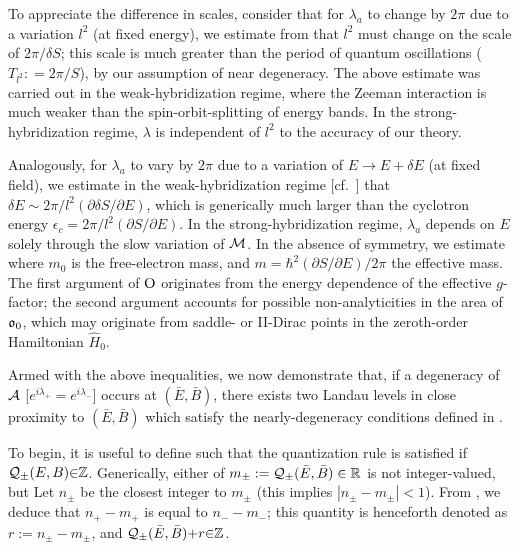 \documentclass[aps, showpacs, twocolumn, notitlepage, superscriptaddress]{revtex4-1}
\begin{document}
To appreciate the difference in scales, consider that for $\lambda_a$ to change by $2\pi$ due to a variation $l^2$ (at fixed energy), we estimate from  that $l^2$ must change on the scale of $2\pi/\delta S$; this scale is much greater than the period of quantum oscillations ($T_{l^2}{:}{=}2\pi/S$), by our assumption of near degeneracy. The above estimate was carried out in the weak-hybridization regime, where the Zeeman interaction is much weaker than the spin-orbit-splitting of energy bands. In the strong-hybridization regime, $\lambda$ is independent of $l^2$ to the accuracy of our theory.

Analogously, for $\lambda_a$ to vary by $2\pi$ due to a variation of $E\rightarrow E+\delta E$ (at fixed field), we estimate in the weak-hybridization regime [cf.\ ] that $\delta E {\sim} 2\pi/l^2 (\partial \delta S/\partial E)$, which is generically much larger than the cyclotron energy $\epsilon_c{=}2\pi/l^2 (\partial  S/\partial E)$. In the strong-hybridization regime, $\lambda_a$ depends on $E$ solely through the slow variation of ${\cal M}$.  In the absence of symmetry, we estimate 
where $m_0$ is the free-electron mass, and $m{=}\hbar^2(\partial S/\partial E)/2\pi$ the effective mass. The first argument of $\text{O}$ originates from the energy dependence of the effective $g$-factor; the second argument accounts for possible non-analyticities in the area of $\mathfrak{o}_0$, which may originate from saddle- or II-Dirac points in the zeroth-order Hamiltonian $\hat{H}_0$.

Armed with the above inequalities, we now demonstrate that, if a degeneracy of ${\cal A}$ [$e^{i\lambda_+}{=}e^{i\lambda_-}$] occurs at $(\bar{E},\bar{B})$, there exists two Landau levels in close proximity to $(\bar{E},\bar{B})$ which satisfy the nearly-degeneracy conditions defined in .

To begin, it is useful to define
such that the quantization rule  is satisfied if ${\cal Q}_{\pm}(E,B){\in}\mathbb{Z}$. 
Generically, either of $m_{\pm}:={\cal Q}_{\pm}(\bar{E},\bar{B})\in \mathbb{R}$ is not integer-valued, but 
Let $n_{\pm}$ be the closest integer to $m_{\pm}$ (this implies $|n_{\pm}-m_{\pm}|<1$).  From , we deduce that $n_+-m_+$ is equal to $n_--m_-$; this quantity is henceforth denoted as $r:= n_{\pm}-m_{\pm}$, and  ${\cal Q}_{\pm}(\bar{E},\bar{B}){+}r{\in} \mathbb{Z}$. 
\end{document}
